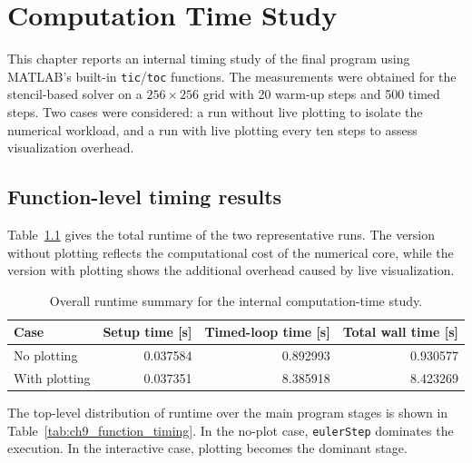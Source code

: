 \chapter{Computation Time Study}

This chapter reports an internal timing study of the final program using MATLAB's built-in \texttt{tic}/\texttt{toc} functions. The measurements were obtained for the stencil-based solver on a \(256\times256\) grid with 20 warm-up steps and 500 timed steps. Two cases were considered: a run without live plotting to isolate the numerical workload, and a run with live plotting every ten steps to assess visualization overhead.

\section{Function-level timing results}

Table~\ref{tab:ch9_run_summary} gives the total runtime of the two representative runs. The version without plotting reflects the computational cost of the numerical core, while the version with plotting shows the additional overhead caused by live visualization.

\begin{table}[htbp]
    \centering
    \caption{Overall runtime summary for the internal computation-time study.}
    \label{tab:ch9_run_summary}
    \begin{tabular}{lrrr}
        \toprule
        Case & Setup time [s] & Timed-loop time [s] & Total wall time [s] \\
        \midrule
        No plotting   & 0.037584 & 0.892993 & 0.930577 \\
        With plotting & 0.037351 & 8.385918 & 8.423269 \\
        \bottomrule
    \end{tabular}
\end{table}

The top-level distribution of runtime over the main program stages is shown in Table~\ref{tab:ch9_function_timing}. In the no-plot case, \texttt{eulerStep} dominates the execution. In the interactive case, plotting becomes the dominant stage.

